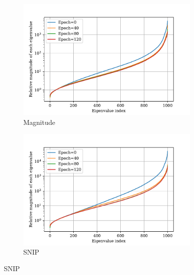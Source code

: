 \documentclass{article} %
\begin{document}
\begin{figure}
\begin{subfigure}[b]{.49\textwidth}
  \end{subfigure}
  \begin{subfigure}[b]{.49\textwidth}
    \includegraphics[width=\textwidth]{plots/nips_rebuttal/during/mag.pdf}
   \caption{\small Magnitude}

  \end{subfigure}
   \begin{subfigure}[b]{.49\textwidth}
        \includegraphics[width=\textwidth]{plots/nips_rebuttal/during/snip.pdf}
   \caption{\small SNIP}


\end{subfigure}
\end{figure}
\end{document}
